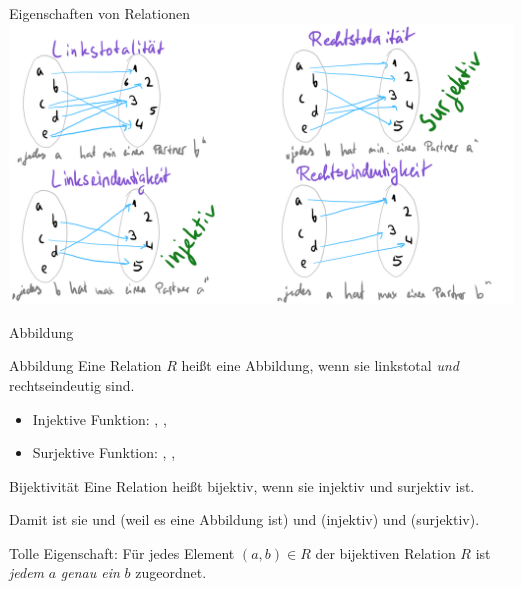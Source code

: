 \documentclass{beamer}
\begin{document}
\ifdefined\printmode
\begin{frame}{Eigenschaften von Relationen}
	\includegraphics[width=\linewidth]{../images/mengen_alle.png}
\end{frame}
\fi

\begin{frame}{Abbildung}
	\begin{block}{Abbildung}
		Eine Relation $R$ heißt eine Abbildung, wenn sie linkstotal \emph{und} rechtseindeutig sind.
	\end{block}
	
	\begin{itemize}
		\item Injektive Funktion: , , 
		\item Surjektive Funktion: , , 
	\end{itemize}
	
	
	\begin{block}{Bijektivität}
		Eine Relation heißt bijektiv, wenn sie injektiv und surjektiv ist.
	\end{block}
	
	Damit ist sie  und  (weil es eine Abbildung ist) und  (injektiv) und  (surjektiv).
	
	  Tolle Eigenschaft:   Für jedes Element $(a, b) \in R$ der bijektiven Relation $R$ ist \emph{jedem} $a$ \emph{genau ein} $b$ zugeordnet. 
	
\end{frame}
\end{document}
